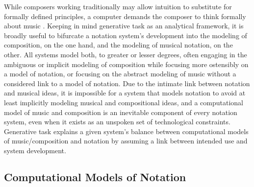 \documentclass{article}
\begin{document}
While composers working traditionally may allow intuition to substitute for
formally defined principles, a computer demands the composer to think formally
about music \cite{Xenakis:1992rq}. Keeping in mind generative task as an
analytical framework, it is broadly useful to bifurcate a  notation
system's development into the modeling of composition, on the one
hand, and the modeling of musical notation, on the other. All systems model
both, to greater or lesser degrees, often engaging in the ambiguous or implicit
modeling of composition while focusing more ostensibly on a model of
notation, or focusing on the abstract modeling of music without a considered
link to a model of notation. Due to the intimate link between notation and
musical ideas, it is impossible for a system that models notation to avoid at
least implicitly modeling musical and compositional ideas, and a computational
model of music and composition is an inevitable component of every
notation system, even when it exists as an unspoken set of technological
constraints. Generative task explains a given system's balance between
computational models of music/composition and notation by assuming a link
between intended use and system development.

\subsection{Computational Models of Notation}
\end{document}
